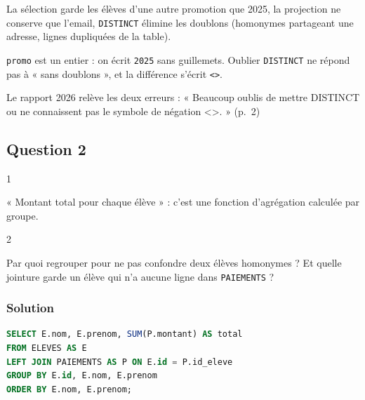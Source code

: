 \documentclass[11pt,a4paper]{article}
\begin{document}
La sélection garde les élèves d'une autre promotion que 2025, la projection ne conserve que l'email, \texttt{DISTINCT} élimine les doublons (homonymes partageant une adresse, lignes dupliquées de la table).

\begin{piege}

\texttt{promo} est un entier : on écrit \texttt{2025} sans guillemets. Oublier \texttt{DISTINCT} ne répond pas à « sans doublons », et la différence s'écrit \texttt{\textless{}\textgreater{}}.

\end{piege}

\begin{jury}

Le rapport 2026 relève les deux erreurs : « Beaucoup oublis de mettre DISTINCT ou ne connaissent pas le symbole de négation \textless\textgreater. » (p.~2)

\end{jury}

\hypertarget{question-2}{%
\subsection{Question 2}\label{question-2}}

\begin{indication}{1}

« Montant total pour chaque élève » : c'est une fonction d'agrégation calculée par groupe.

\end{indication}

\begin{indication}{2}

Par quoi regrouper pour ne pas confondre deux élèves homonymes ? Et quelle jointure garde un élève qui n'a aucune ligne dans \texttt{PAIEMENTS} ?

\end{indication}

\hypertarget{solution-1}{%
\subsubsection{Solution}\label{solution-1}}

\begin{lstlisting}[language=SQL]
SELECT E.nom, E.prenom, SUM(P.montant) AS total
FROM ELEVES AS E
LEFT JOIN PAIEMENTS AS P ON E.id = P.id_eleve
GROUP BY E.id, E.nom, E.prenom
ORDER BY E.nom, E.prenom;
\end{lstlisting}
\end{document}

